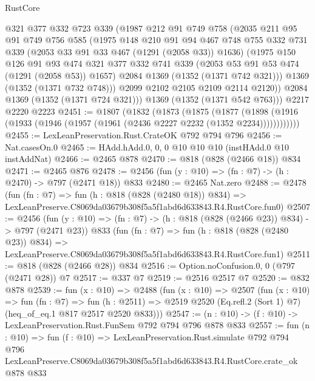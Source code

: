 \begin{lexlean}{RustCore}
\begin{coremodule}
        @321
        @377
        @332
        @723
        @339
        (@1987
          @212
          @91
          @749
          @758
          (@2035
            @211
            @95
            @91
            @749
            @756
            @585
            (@1975
              @148
              @210
              @91
              @94
              @467
              @748
              @755
              @332
              @731
              @339
              (@2053 @33 @91 @33 @467 (@1291 (@2058 @33)) @1636)
              (@1975
                @150
                @126
                @91
                @93
                @474
                @321
                @377
                @332
                @741
                @339
                (@2053 @53 @91 @53 @474 (@1291 (@2058 @53)) @1657)
                @2084
                @1369
                (@1352 (@1371 @742 @321)))
              @1369
              (@1352 (@1371 @732 @748)))
            @2099
            @2102
            @2105
            @2109
            @2114
            @2120))
        @2084
        @1369
        (@1352 (@1371 @724 @321)))
      @1369
      (@1352 (@1371 @542 @763)))
    @2217
    @2220
    @2223
@2451 := @1807
    (@1832
      (@1873
        (@1875
          (@1877
            (@1898 (@1916 (@1933 (@1946 (@1957 (@1961 (@2436 @2227 @2232 (@1352 @2234))))))))))))
@2455 := LexLeanPreservation.Rust.CrateOK @792 @794 @796
@2456 := Nat.casesOn.{0}
@2465 := HAdd.hAdd.{0, 0, 0} @10 @10 @10 (instHAdd.{0} @10 instAddNat)
@2466 := @2465 @878
@2470 := @818 (@828 (@2466 @18)) @834
@2471 := @2465 @876
@2478 := @2456 (fun (y : @10) => (fn : @7) -> (h : @2470) -> @797 (@2471 @18)) @833
@2480 := @2465 Nat.zero
@2488 := @2478
    (fun (fn : @7) =>
    fun (h : @818 (@828 (@2480 @18)) @834) =>
    LexLeanPreserve.C8069da03679b308f5a5f1abd6d633843.R4.RustCore.fun0)
@2507 := @2456
    (fun (y : @10) => (fn : @7) -> (h : @818 (@828 (@2466 @23)) @834) -> @797 (@2471 @23))
    @833
    (fun (fn : @7) =>
    fun (h : @818 (@828 (@2480 @23)) @834) =>
    LexLeanPreserve.C8069da03679b308f5a5f1abd6d633843.R4.RustCore.fun1)
@2511 := @818 (@828 (@2466 @28)) @834
@2516 := Option.noConfusion.{0, 0} (@797 (@2471 @28)) @7
@2517 := @337 @7
@2519 := @2516 @2517 @7
@2520 := @832 @878
@2539 := fun (x : @10) =>
  @2488
    (fun (x : @10) =>
    @2507
      (fun (x : @10) =>
      fun (fn : @7) =>
      fun (h : @2511) =>
      @2519 @2520 (Eq.refl.{2} (Sort 1) @7) (heq_of_eq.{1} @817 @2517 @2520 @833)))
@2547 := (n : @10) -> (f : @10) -> LexLeanPreservation.Rust.FunSem @792 @794 @796 @878 @833
@2557 := fun (n : @10) =>
  fun (f : @10) =>
  LexLeanPreservation.Rust.simulate
    @792
    @794
    @796
    LexLeanPreserve.C8069da03679b308f5a5f1abd6d633843.R4.RustCore.crate_ok
    @878
    @833
\end{coremodule}
\end{lexlean}
